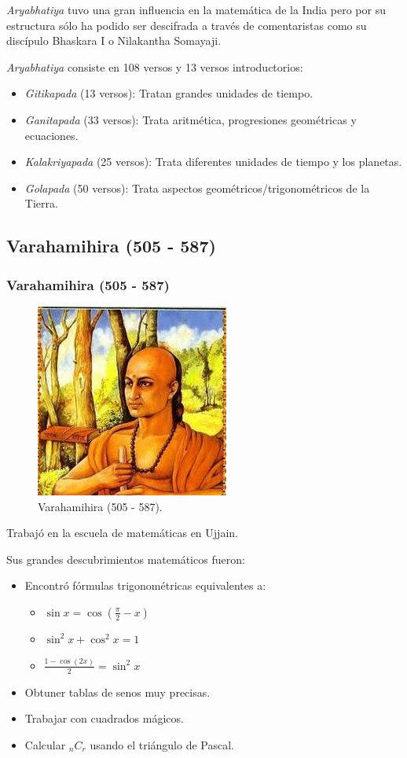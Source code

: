 \documentclass[compress, aspectratio=169]{beamer} %
\begin{document}
		\begin{frame}
			\textit{Aryabhatiya} tuvo una gran influencia en la matemática de la India pero por su estructura sólo ha
			podido ser descifrada a través de comentaristas como su discípulo Bhaskara I o Nilakantha Somayaji.
								
						
			\textit{Aryabhatiya} consiste en 108 versos y 13 versos introductorios:
			\begin{itemize}
				\item \textit{Gitikapada} (13 versos):  Tratan grandes unidades de tiempo.
				\item \textit{Ganitapada} (33 versos): Trata aritmética, progresiones geométricas y ecuaciones.
				\item \textit{Kalakriyapada} (25 versos): Trata diferentes unidades de tiempo y los planetas.
				\item \textit{Golapada} (50 versos): Trata aspectos geométricos/trigonométricos de la Tierra.
			\end{itemize}
		\end{frame}

	\subsection{Varahamihira (505 - 587)}
		\begin{frame}
			\frametitle{Varahamihira (505 - 587)}
			\begin{figure}
				\centering
				\includegraphics[width = .3\linewidth]{varahamihira.jpg}
				\caption{Varahamihira (505 - 587).}
			\end{figure}
		\end{frame}

		\begin{frame}
			Trabajó en la escuela de matemáticas en Ujjain.
			
			Sus grandes descubrimientos matemáticos fueron:
			\begin{itemize}
				\item Encontró fórmulas trigonométricas equivalentes a:
				\begin{itemize}
					\item $\displaystyle \sin x = \cos \left(\frac{\pi}{2} - x \right)$
					\item $\displaystyle \sin^2 x + \cos^2 x = 1$
					\item $\displaystyle \frac{1 - \cos(2x)}{2} = \sin^2 x$
				\end{itemize}
				\item Obtuner tablas de senos muy precisas.
				\item Trabajar con cuadrados mágicos.
				\item Calcular $_n C_r$ usando el triángulo de Pascal.
			\end{itemize}
		\end{frame}
\end{document}
